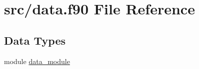 \hypertarget{data_8f90}{\section{src/data.f90 File Reference}
\label{data_8f90}
}
\subsection*{Data Types}
\begin{DoxyCompactItemize}
\item 
module \hyperlink{classdata__module}{data\-\_\-module}
\end{DoxyCompactItemize}
